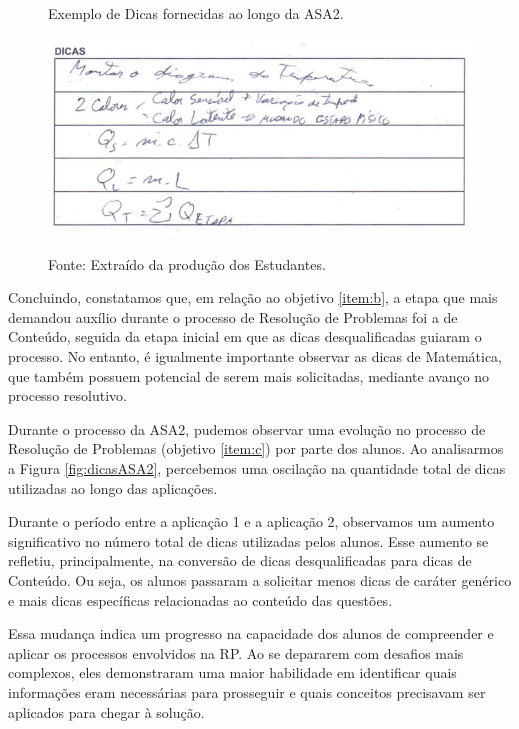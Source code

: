 \begin{figure}[ht]
\begin{center}
\caption{Exemplo de Dicas fornecidas ao longo da ASA2.}
\includegraphics[width=1\textwidth]{fig/dicasasa2.png}
\label{fig:dicasasa2}
\caption*{Fonte: Extraído da produção dos Estudantes.}
\end{center}
\end{figure}

Concluindo, constatamos que, em relação ao objetivo \ref{item:b}, a etapa que mais demandou auxílio durante o processo de Resolução de Problemas foi a de Conteúdo, seguida da etapa inicial em que as dicas desqualificadas guiaram o processo. No entanto, é igualmente importante observar as dicas de Matemática, que também possuem potencial de serem mais solicitadas, mediante avanço no processo resolutivo.

Durante o processo da ASA2, pudemos observar uma evolução no processo de Resolução de Problemas (objetivo \ref{item:c}) por parte dos alunos. Ao analisarmos a Figura \ref{fig:dicasASA2}, percebemos uma oscilação na quantidade total de dicas utilizadas ao longo das aplicações.

Durante o período entre a aplicação 1 e a aplicação 2, observamos um aumento significativo no número total de dicas utilizadas pelos alunos. Esse aumento se refletiu, principalmente, na conversão de dicas desqualificadas para dicas de Conteúdo. Ou seja, os alunos passaram a solicitar menos dicas de caráter genérico e mais dicas específicas relacionadas ao conteúdo das questões.

Essa mudança indica um progresso na capacidade dos alunos de compreender e aplicar os processos envolvidos na RP. Ao se depararem com desafios mais complexos, eles demonstraram uma maior habilidade em identificar quais informações eram necessárias para prosseguir e quais conceitos precisavam ser aplicados para chegar à solução.

